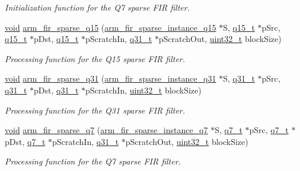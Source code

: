 \begin{DoxyCompactItemize}
\begin{DoxyCompactList}\small\item\em Initialization function for the Q7 sparse F\-I\-R filter. \end{DoxyCompactList}\item 
\hyperlink{group___n_a_m_e_ga18028b8badbf1ea7e704ccac3c488e82}{void} \hyperlink{group___f_i_r___sparse_ga2bffda2e156e72427e19276cd9c3d3cc}{arm\-\_\-fir\-\_\-sparse\-\_\-q15} (\hyperlink{structarm__fir__sparse__instance__q15}{arm\-\_\-fir\-\_\-sparse\-\_\-instance\-\_\-q15} $\ast$S, \hyperlink{arm__math_8h_ab5a8fb21a5b3b983d5f54f31614052ea}{q15\-\_\-t} $\ast$p\-Src, \hyperlink{arm__math_8h_ab5a8fb21a5b3b983d5f54f31614052ea}{q15\-\_\-t} $\ast$p\-Dst, \hyperlink{arm__math_8h_ab5a8fb21a5b3b983d5f54f31614052ea}{q15\-\_\-t} $\ast$p\-Scratch\-In, \hyperlink{arm__math_8h_adc89a3547f5324b7b3b95adec3806bc0}{q31\-\_\-t} $\ast$p\-Scratch\-Out, \hyperlink{stdint_8h_a435d1572bf3f880d55459d9805097f62}{uint32\-\_\-t} block\-Size)
\begin{DoxyCompactList}\small\item\em Processing function for the Q15 sparse F\-I\-R filter. \end{DoxyCompactList}\item 
\hyperlink{group___n_a_m_e_ga18028b8badbf1ea7e704ccac3c488e82}{void} \hyperlink{group___f_i_r___sparse_ga03e9c2f0f35ad67d20bac66be9f920ec}{arm\-\_\-fir\-\_\-sparse\-\_\-q31} (\hyperlink{structarm__fir__sparse__instance__q31}{arm\-\_\-fir\-\_\-sparse\-\_\-instance\-\_\-q31} $\ast$S, \hyperlink{arm__math_8h_adc89a3547f5324b7b3b95adec3806bc0}{q31\-\_\-t} $\ast$p\-Src, \hyperlink{arm__math_8h_adc89a3547f5324b7b3b95adec3806bc0}{q31\-\_\-t} $\ast$p\-Dst, \hyperlink{arm__math_8h_adc89a3547f5324b7b3b95adec3806bc0}{q31\-\_\-t} $\ast$p\-Scratch\-In, \hyperlink{stdint_8h_a435d1572bf3f880d55459d9805097f62}{uint32\-\_\-t} block\-Size)
\begin{DoxyCompactList}\small\item\em Processing function for the Q31 sparse F\-I\-R filter. \end{DoxyCompactList}\item 
\hyperlink{group___n_a_m_e_ga18028b8badbf1ea7e704ccac3c488e82}{void} \hyperlink{group___f_i_r___sparse_gae86c145efc2d9ec32dc6d8c1ad2ccb3c}{arm\-\_\-fir\-\_\-sparse\-\_\-q7} (\hyperlink{structarm__fir__sparse__instance__q7}{arm\-\_\-fir\-\_\-sparse\-\_\-instance\-\_\-q7} $\ast$S, \hyperlink{arm__math_8h_ae541b6f232c305361e9b416fc9eed263}{q7\-\_\-t} $\ast$p\-Src, \hyperlink{arm__math_8h_ae541b6f232c305361e9b416fc9eed263}{q7\-\_\-t} $\ast$p\-Dst, \hyperlink{arm__math_8h_ae541b6f232c305361e9b416fc9eed263}{q7\-\_\-t} $\ast$p\-Scratch\-In, \hyperlink{arm__math_8h_adc89a3547f5324b7b3b95adec3806bc0}{q31\-\_\-t} $\ast$p\-Scratch\-Out, \hyperlink{stdint_8h_a435d1572bf3f880d55459d9805097f62}{uint32\-\_\-t} block\-Size)
\begin{DoxyCompactList}\small\item\em Processing function for the Q7 sparse F\-I\-R filter. \end{DoxyCompactList}\end{DoxyCompactItemize}



